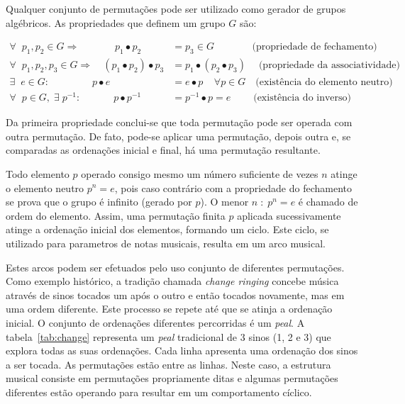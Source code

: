 Qualquer conjunto de permutações pode ser utilizado como gerador de grupos algébricos.\cite{permMusic} As propriedades que definem um grupo $G$ são:

\begin{equation}\label{eq:groups}
\begin{split}
\forall \;\; p_1,p_2 \in G \Rightarrow\quad\quad\quad\;\; p_1 \bullet p_2 & = p_3 \in G  \quad\quad\quad\;\;\;\text{(propriedade de fechamento)} \\
\forall \;\; p_1,p_2,p_3 \in G \Rightarrow\quad (p_1\bullet p_2)\bullet p_3 & = p_1\bullet (p_2\bullet p_3)\quad\;  \text{(propriedade da associatividade)} \\
\exists \;\; e \in G :\quad\quad\quad\quad\; p \bullet e & = e \bullet p \;\;\;\; \forall p \in G  \quad \text{(existência do elemento neutro)} \\
\forall \;\; p \in G, \;\exists\; p^{-1} :\quad\quad\quad\;  p\bullet p^{-1} & =p^{-1}\bullet p = e  \quad\quad\;\text{(existência do inverso)}
\end{split}
\end{equation}


Da primeira propriedade conclui-se que toda permutação pode ser operada com outra permutação. De fato, pode-se aplicar uma permutação, depois outra e, se comparadas as ordenações inicial e final, há uma permutação resultante.

Todo elemento $p$ operado consigo mesmo um número suficiente de vezes $n$ atinge o elemento neutro $p^n=e$, pois caso contrário com a propriedade do fechamento se prova que o grupo é infinito (gerado por $p$). O menor $n\;:\;p^n=e$ é chamado de ordem do elemento. Assim, uma permutação finita $p$ aplicada sucessivamente atinge a ordenação inicial dos elementos, formando um ciclo. Este ciclo, se utilizado para parametros de notas musicais, resulta em um arco musical.

Estes arcos podem ser efetuados pelo uso conjunto de diferentes permutações. Como exemplo
histórico, a tradição chamada \emph{change ringing} concebe música através de sinos tocados um após o outro e então tocados novamente, mas em uma ordem diferente. Este processo se repete até que se atinja a ordenação inicial. O conjunto de ordenações diferentes percorridas é um \emph{peal}. A tabela~\ref{tab:change} representa um \emph{peal} tradicional de 3 sinos (1, 2 e 3) que explora todas as suas ordenações. Cada linha apresenta uma ordenação dos sinos a ser tocada. As permutações estão entre as linhas.
Neste caso, a estrutura musical consiste em permutações propriamente ditas e algumas permutações diferentes estão operando para resultar em um comportamento cíclico.

